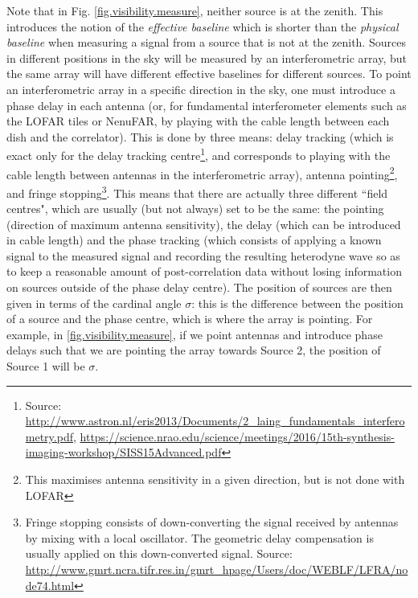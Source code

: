 \pg
Note that in Fig. \ref{fig.visibility.measure}, neither source is at the zenith. This introduces the notion of the \emph{effective baseline} which is shorter than the \emph{physical baseline} when measuring a signal from a source that is not at the zenith. Sources in different positions in the sky will be measured by an interferometric array, but the same array will have different effective baselines for different sources. To point an interferometric array in a specific direction in the sky, one must introduce a phase delay in each antenna (or, for fundamental interferometer elements such as the LOFAR tiles or NenuFAR, by playing with the cable length between each dish and the correlator). This is done by three means: delay tracking (which is exact only for the delay tracking centre\footnote{Source: \url{http://www.astron.nl/eris2013/Documents/2_laing_fundamentals_interferometry.pdf}, \url{https://science.nrao.edu/science/meetings/2016/15th-synthesis-imaging-workshop/SISS15Advanced.pdf}}, and corresponds to playing with the cable length between antennas in the interferometric array), antenna pointing\footnote{This maximises antenna sensitivity in a given direction, but is not done with LOFAR}, and fringe stopping\footnote{Fringe stopping consists of down-converting the signal received by antennas by mixing with a local oscillator. The geometric delay compensation is usually applied on this down-converted signal. Source: \url{http://www.gmrt.ncra.tifr.res.in/gmrt_hpage/Users/doc/WEBLF/LFRA/node74.html}}.
This means that there are actually three different ``field centres", which are usually (but not always) set to be the same: the pointing (direction of maximum antenna sensitivity), the delay (which can be introduced in cable length) and the phase tracking (which consists of applying a known signal to the measured signal and recording the resulting heterodyne wave so as to keep a reasonable amount of post-correlation data without losing information on sources outside of the phase delay centre). The position of sources are then given in terms of the cardinal angle $\sigma$: this is the difference between the position of a source and the phase centre, which is where the array is pointing. For example, in \cref{fig.visibility.measure}, if we point antennas and introduce phase delays such that we are pointing the array towards Source 2, the position of Source 1 will be $\sigma$.


